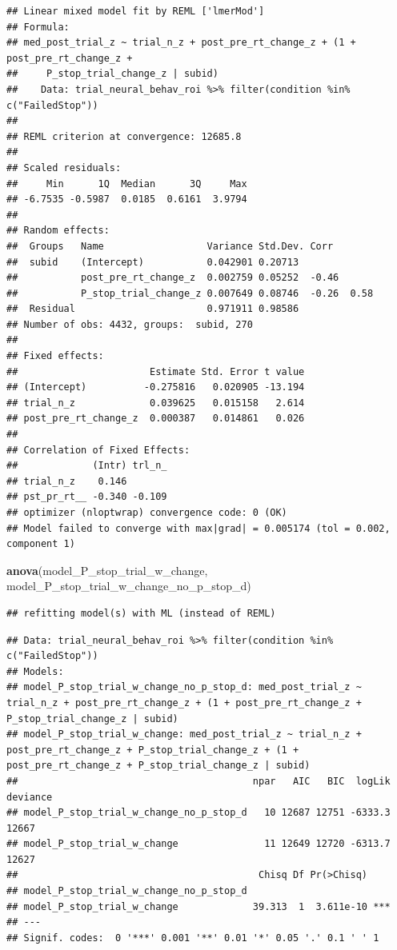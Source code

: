 \documentclass[
]{article}
\newenvironment{Shaded}{\begin{snugshade}}{\end{snugshade}}
\newcommand{\KeywordTok}[1]{\textcolor[rgb]{0.13,0.29,0.53}{\textbf{#1}}}
\newcommand{\NormalTok}[1]{#1}
\begin{document}
\begin{verbatim}
## Linear mixed model fit by REML ['lmerMod']
## Formula: 
## med_post_trial_z ~ trial_n_z + post_pre_rt_change_z + (1 + post_pre_rt_change_z +  
##     P_stop_trial_change_z | subid)
##    Data: trial_neural_behav_roi %>% filter(condition %in% c("FailedStop"))
## 
## REML criterion at convergence: 12685.8
## 
## Scaled residuals: 
##     Min      1Q  Median      3Q     Max 
## -6.7535 -0.5987  0.0185  0.6161  3.9794 
## 
## Random effects:
##  Groups   Name                  Variance Std.Dev. Corr       
##  subid    (Intercept)           0.042901 0.20713             
##           post_pre_rt_change_z  0.002759 0.05252  -0.46      
##           P_stop_trial_change_z 0.007649 0.08746  -0.26  0.58
##  Residual                       0.971911 0.98586             
## Number of obs: 4432, groups:  subid, 270
## 
## Fixed effects:
##                       Estimate Std. Error t value
## (Intercept)          -0.275816   0.020905 -13.194
## trial_n_z             0.039625   0.015158   2.614
## post_pre_rt_change_z  0.000387   0.014861   0.026
## 
## Correlation of Fixed Effects:
##             (Intr) trl_n_
## trial_n_z    0.146       
## pst_pr_rt__ -0.340 -0.109
## optimizer (nloptwrap) convergence code: 0 (OK)
## Model failed to converge with max|grad| = 0.005174 (tol = 0.002, component 1)
\end{verbatim}

\begin{Shaded}
\begin{Highlighting}[]
\KeywordTok{anova}\NormalTok{(model_P_stop_trial_w_change, model_P_stop_trial_w_change_no_p_stop_d)}
\end{Highlighting}
\end{Shaded}

\begin{verbatim}
## refitting model(s) with ML (instead of REML)
\end{verbatim}

\begin{verbatim}
## Data: trial_neural_behav_roi %>% filter(condition %in% c("FailedStop"))
## Models:
## model_P_stop_trial_w_change_no_p_stop_d: med_post_trial_z ~ trial_n_z + post_pre_rt_change_z + (1 + post_pre_rt_change_z + P_stop_trial_change_z | subid)
## model_P_stop_trial_w_change: med_post_trial_z ~ trial_n_z + post_pre_rt_change_z + P_stop_trial_change_z + (1 + post_pre_rt_change_z + P_stop_trial_change_z | subid)
##                                         npar   AIC   BIC  logLik deviance
## model_P_stop_trial_w_change_no_p_stop_d   10 12687 12751 -6333.3    12667
## model_P_stop_trial_w_change               11 12649 12720 -6313.7    12627
##                                          Chisq Df Pr(>Chisq)    
## model_P_stop_trial_w_change_no_p_stop_d                         
## model_P_stop_trial_w_change             39.313  1  3.611e-10 ***
## ---
## Signif. codes:  0 '***' 0.001 '**' 0.01 '*' 0.05 '.' 0.1 ' ' 1
\end{verbatim}
\end{document}
